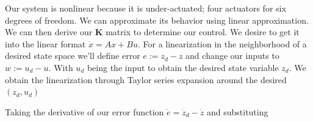 \documentclass{article}
\begin{document}
\begin{multicols}{2}
Our system is nonlinear because it is under-actuated; four actuators for six degrees of freedom. We can approximate its behavior using linear approximation.  We can then derive  our $\boldsymbol{K}$ matrix to determine our control.  We desire to get it into the linear format $\dot{x} = Ax + Bu$.
\noindent For a linearization in the neighborhood of a desired state space we'll define error $ e :=  z_d-z $ and change our inputs to $ w :=  u_d-u $.
With $u_d$ being the input to obtain the desired  state variable $z_d $.  We obtain the linearization through Taylor series expansion around the desired $(z_d,u_d)$

Taking the derivative of our error function $\dot{e}=\dot{z}_d-\dot{z}$ and substituting %

\end{multicols}
\end{document}
